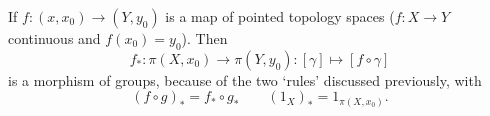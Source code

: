 \begin{remark}
    If $f: (x, x_0) \to (Y, y_0)$ is a map of pointed topology spaces ($f: X \to Y$ continuous and $f(x_0) = y_0$).
    Then \[
        f_*:\pi(X, x_0) \to  \pi(Y, y_0): [\gamma] \mapsto [f  \circ \gamma]
    \]
    is a morphism of groups, because of the two `rules' discussed previously, with
    \[
        (f \circ g)_* = f_*  \circ g_* \qquad (1_X)_* = 1_{\pi(X, x_0)}
    .\] 
\end{remark}
